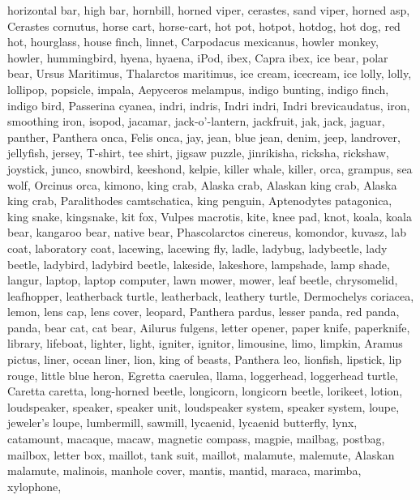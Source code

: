 \documentclass{article}
\begin{document}
{{horizontal bar, high bar},
{hornbill},
{horned viper, cerastes, sand viper, horned asp, Cerastes cornutus},
{horse cart, horse-cart},
{hot pot, hotpot},
{hotdog, hot dog, red hot},
{hourglass},
{house finch, linnet, Carpodacus mexicanus},
{howler monkey, howler},
{hummingbird},
{hyena, hyaena},
{iPod},
{ibex, Capra ibex},
{ice bear, polar bear, Ursus Maritimus, Thalarctos maritimus},
{ice cream, icecream},
{ice lolly, lolly, lollipop, popsicle},
{impala, Aepyceros melampus},
{indigo bunting, indigo finch, indigo bird, Passerina cyanea},
{indri, indris, Indri indri, Indri brevicaudatus},
{iron, smoothing iron},
{isopod},
{jacamar},
{jack-o'-lantern},
{jackfruit, jak, jack},
{jaguar, panther, Panthera onca, Felis onca},
{jay},
{jean, blue jean, denim},
{jeep, landrover},
{jellyfish},
{jersey, T-shirt, tee shirt},
{jigsaw puzzle},
{jinrikisha, ricksha, rickshaw},
{joystick},
{junco, snowbird},
{keeshond},
{kelpie},
{killer whale, killer, orca, grampus, sea wolf, Orcinus orca},
{kimono},
{king crab, Alaska crab, Alaskan king crab, Alaska king crab, Paralithodes camtschatica},
{king penguin, Aptenodytes patagonica},
{king snake, kingsnake},
{kit fox, Vulpes macrotis},
{kite},
{knee pad},
{knot},
{koala, koala bear, kangaroo bear, native bear, Phascolarctos cinereus},
{komondor},
{kuvasz},
{lab coat, laboratory coat},
{lacewing, lacewing fly},
{ladle},
{ladybug, ladybeetle, lady beetle, ladybird, ladybird beetle},
{lakeside, lakeshore},
{lampshade, lamp shade},
{langur},
{laptop, laptop computer},
{lawn mower, mower},
{leaf beetle, chrysomelid},
{leafhopper},
{leatherback turtle, leatherback, leathery turtle, Dermochelys coriacea},
{lemon},
{lens cap, lens cover},
{leopard, Panthera pardus},
{lesser panda, red panda, panda, bear cat, cat bear, Ailurus fulgens},
{letter opener, paper knife, paperknife},
{library},
{lifeboat},
{lighter, light, igniter, ignitor},
{limousine, limo},
{limpkin, Aramus pictus},
{liner, ocean liner},
{lion, king of beasts, Panthera leo},
{lionfish},
{lipstick, lip rouge},
{little blue heron, Egretta caerulea},
{llama},
{loggerhead, loggerhead turtle, Caretta caretta},
{long-horned beetle, longicorn, longicorn beetle},
{lorikeet},
{lotion},
{loudspeaker, speaker, speaker unit, loudspeaker system, speaker system},
{loupe, jeweler's loupe},
{lumbermill, sawmill},
{lycaenid, lycaenid butterfly},
{lynx, catamount},
{macaque},
{macaw},
{magnetic compass},
{magpie},
{mailbag, postbag},
{mailbox, letter box},
{maillot, tank suit},
{maillot},
{malamute, malemute, Alaskan malamute},
{malinois},
{manhole cover},
{mantis, mantid},
{maraca},
{marimba, xylophone},
}
\end{document}
